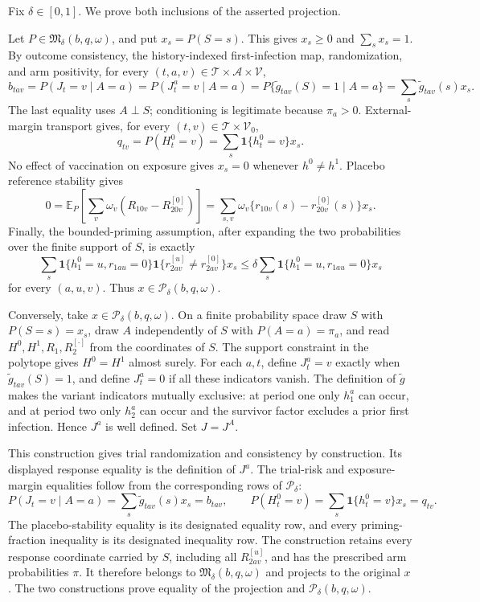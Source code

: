 Fix \(\delta\in[0,1]\).  We prove both inclusions of the asserted projection.

Let \(P\in\mathfrak M_\delta(b,q,\omega)\), and put \(x_s=P(S=s)\).  This gives \(x_s\geq0\) and \(\sum_sx_s=1\).  By outcome consistency, the history-indexed first-infection map, randomization, and arm positivity, for every \((t,a,v)\in\mathcal T\times\mathcal A\times\mathcal V\),
\[
b_{tav}=P(J_t=v\mid A=a)
=P(J_t^a=v\mid A=a)
=P\{\widetilde g_{tav}(S)=1\mid A=a\}
=\sum_s\widetilde g_{tav}(s)x_s.
\]
The last equality uses \(A\perp S\); conditioning is legitimate because \(\pi_a>0\).  External-margin transport gives, for every \((t,v)\in\mathcal T\times\mathcal V_0\),
\[
q_{tv}=P(H_t^0=v)=\sum_s\mathbf 1\{h_t^0=v\}x_s.
\]
No effect of vaccination on exposure gives \(x_s=0\) whenever \(h^0\ne h^1\).  Placebo reference stability gives
\[
0=\mathbb E_P\!\left[\sum_v\omega_v(R_{10v}-R^{[0]}_{20v})\right]
=\sum_{s,v}\omega_v\{r_{10v}(s)-r^{[0]}_{20v}(s)\}x_s.
\]
Finally, the bounded-priming assumption, after expanding the two probabilities over the finite support of \(S\), is exactly
\[
\sum_s\mathbf 1\{h_1^0=u,r_{1au}=0\}
 \mathbf 1\{r^{[u]}_{2av}\ne r^{[0]}_{2av}\}x_s
\leq
\delta\sum_s\mathbf 1\{h_1^0=u,r_{1au}=0\}x_s
\]
for every \((a,u,v)\).  Thus \(x\in\mathcal P_\delta(b,q,\omega)\).

Conversely, take \(x\in\mathcal P_\delta(b,q,\omega)\).  On a finite probability space draw \(S\) with \(P(S=s)=x_s\), draw \(A\) independently of \(S\) with \(P(A=a)=\pi_a\), and read \(H^0,H^1,R_1,R_2^{[\cdot]}\) from the coordinates of \(S\).  The support constraint in the polytope gives \(H^0=H^1\) almost surely.  For each \(a,t\), define \(J_t^a=v\) exactly when \(\widetilde g_{tav}(S)=1\), and define \(J_t^a=0\) if all these indicators vanish.  The definition of \(\widetilde g\) makes the variant indicators mutually exclusive: at period one only \(h_1^a\) can occur, and at period two only \(h_2^a\) can occur and the survivor factor excludes a prior first infection.  Hence \(J^a\) is well defined.  Set \(J=J^A\).

This construction gives trial randomization and consistency by construction.  Its displayed response equality is the definition of \(J^a\).  The trial-risk and exposure-margin equalities follow from the corresponding rows of \(\mathcal P_\delta\):
\[
P(J_t=v\mid A=a)=\sum_s\widetilde g_{tav}(s)x_s=b_{tav},
\qquad
P(H_t^0=v)=\sum_s\mathbf 1\{h_t^0=v\}x_s=q_{tv}.
\]
The placebo-stability equality is its designated equality row, and every priming-fraction inequality is its designated inequality row.  The construction retains every response coordinate carried by \(S\), including all \(R^{[u]}_{2av}\), and has the prescribed arm probabilities \(\pi\).  It therefore belongs to \(\mathfrak M_\delta(b,q,\omega)\) and projects to the original \(x\).  The two constructions prove equality of the projection and \(\mathcal P_\delta(b,q,\omega)\).

